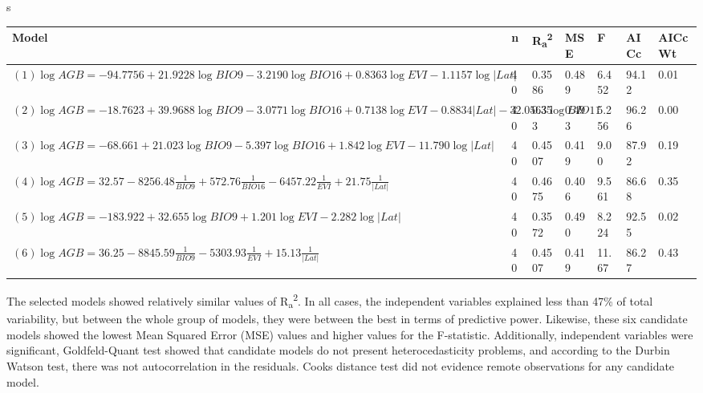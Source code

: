 \documentclass[review, authoryear]{elsarticle}   	%
\begin{document}
\begin{table}[htbp]s
   \centering
   \begin{tabular}{p{7cm}p{0.5cm}p{1.0cm}p{1.0cm}p{1.0cm}p{1.0cm}p{1.0cm}}%
      \toprule
       Model  & n & R\textsubscript{a}\textsuperscript{2} & MSE & F & AICc & AICcWt\\
      \midrule
     $(1)\log{AGB}=-94.7756+21.9228\log{BIO9}-3.2190\log{BIO16}+0.8363\log{EVI}-1.1157\log{|Lat|}$&40&0.3586&0.489&6.452&94.12&0.01\\
     $(2)\log{AGB}=-18.7623+39.9688\log{BIO9}-3.0771\log{BIO16}+0.7138\log{EVI}-0.8834|Lat|-32.0563\log{BIO11}$ &40&0.353&0.493&5.256&96.26&0.00\\
     $(3)\log{AGB}=-68.661+21.023\log{BIO9}-5.397\log{BIO16}+1.842\log{EVI}-11.790\log{|Lat|}$&40&0.4507&0.419&9.00&87.92&0.19\\
     $(4)\log{AGB}=32.57-8256.48\frac{1}{BIO9}+572.76\frac{1}{BIO16}-6457.22\frac{1}{EVI}+21.75\frac{1}{|Lat|}$&40&0.4675&0.406&9.561&86.68&0.35\\
     $(5)\log{AGB}=-183.922+32.655\log{BIO9}+1.201\log{EVI}-2.282\log{|Lat|}$&40&0.3572&0.490&8.224&92.55&0.02\\
     $(6)\log{AGB}=36.25-8845.59\frac{1}{BIO9}-5303.93\frac{1}{EVI}+15.13\frac{1}{|Lat|}$&40&0.4507&0.419&11.67&86.27&0.43\\
      \bottomrule
  \end{tabular}
   \label{tab:models}
\end{table}


The selected models showed relatively similar values of R\textsubscript{a}\textsuperscript{2}. In all cases, the independent variables explained less than 47\% of total variability, but between the whole group of models,  they were between the best in terms of predictive power. Likewise, these six candidate models showed the lowest Mean Squared Error (MSE) values and higher values for the F-statistic. Additionally, independent variables were significant, Goldfeld-Quant test showed that candidate models do not present heterocedasticity problems, and according to the Durbin Watson test, there was not autocorrelation in the residuals. Cooks distance test did not evidence remote observations for any candidate model. 
\end{document}
